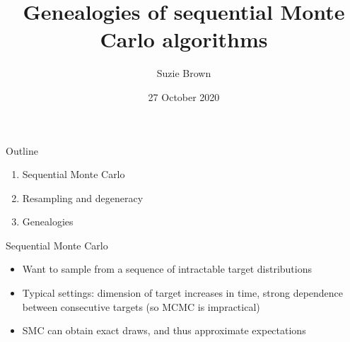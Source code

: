 \documentclass[aspectratio=169]{beamer}
\title[SMC genealogies]{Genealogies of sequential Monte Carlo algorithms}
\author{Suzie Brown}
\date{27 October 2020}
\theoremstyle{definition}
\begin{document}
\begin{frame}
\maketitle
\end{frame}


\begin{frame}{Outline}
\begin{enumerate}
\item Sequential Monte Carlo
\item Resampling and degeneracy
\item Genealogies
\end{enumerate}
\end{frame}


\begin{frame}{Sequential Monte Carlo}
\begin{itemize}
\item Want to sample from a sequence of intractable target distributions
\item Typical settings: dimension of target increases in time, strong dependence between consecutive targets (so MCMC is impractical)
\item SMC can obtain exact draws, and thus approximate expectations
\end{itemize}

\end{frame}
\end{document}
